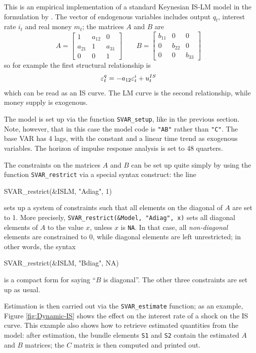 \documentclass[a4paper,10pt]{article}
\newcommand{\PrE}[1]{\ensuremath \varepsilon_{#1}}
\newcommand{\StS}[1]{\ensuremath u_{#1}}
\begin{document}
This is an empirical implementation of a standard Keynesian IS-LM
model in the formulation by \cite{Pagan95}. The vector of endogenous
variables includes output $q_t$, interest rate $i_t$ and real money
$m_t$; the matrices $A$ and $B$ are
\[
A = \left[ \begin{array}{ccc}
    1 & a_{12} & 0 \\ a_{21} & 1 & a_{31} \\ 0 & 0 & 1
  \end{array} \right]
\qquad
B = \left[ \begin{array}{ccc}
    b_{11} & 0 & 0 \\ 0 & b_{22} & 0 \\ 0 & 0 & b_{33}
  \end{array} \right]
\]
so for example the first structural relationship is
\begin{equation}
  \label{eq:AB-IScurve}
  \PrE{t}^q = -a_{12} \PrE{t}^i + \StS{t}^{IS}
\end{equation}
which can be read as an IS curve. The LM curve is the second
relationship, while money supply is exogenous.

The model is set up via the function \texttt{SVAR\_setup}, like in the
previous section. Note, however, that in this case the model code is
\texttt{"AB"} rather than \texttt{"C"}.  The base VAR has 4 lags, with
the constant and a linear time trend as exogenous variables. The
horizon of impulse response analysis is set to 48 quarters.

The constraints on the matrices $A$ and $B$ can be set up quite simply
by using the function \texttt{SVAR\_restrict} via a special syntax
construct: the line
\begin{code}
  SVAR_restrict(&ISLM, "Adiag", 1)
\end{code}
sets up a system of constraints such that all elements on the diagonal
of $A$ are set to 1. More precisely, \texttt{SVAR\_restrict(\&Model,
  "Adiag", x)} sets all diagonal elements of $A$ to the value $x$,
unless $x$ is \texttt{NA}. In that case, all \emph{non-diagonal}
elements are constrained to 0, while diagonal elements are left
unrestricted; in other words, the syntax
\begin{code}
  SVAR_restrict(&ISLM, "Bdiag", NA)
\end{code}
is a compact form for saying ``$B$ is diagonal''. The other three
constraints are set up as usual.

Estimation is then carried out via the \texttt{SVAR\_estimate}
function; as an example, Figure \ref{fig:Dynamic-IS} shows the effect
on the interest rate of a shock on the IS curve.  This example also
shows how to retrieve estimated quantities from the model: after
estimation, the bundle elements \texttt{S1} and \texttt{S2}
contain the estimated $A$ and $B$ matrices; the $C$ matrix is then
computed and printed out.
\end{document}
